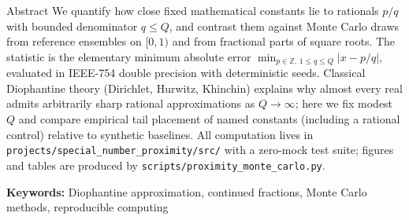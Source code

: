 \documentclass[
  ignorenonframetext,
]{beamer}
\author{\texorpdfstring{}{}}
\date{}
\begin{document}
\begin{frame}[fragile]{Abstract}
\protect{}\label{abstract}
We quantify how close fixed mathematical constants lie to rationals
\(p/q\) with bounded denominator \(q \leq Q\), and contrast them against
Monte Carlo draws from reference ensembles on \([0,1)\) and from
fractional parts of square roots. The statistic is the elementary
minimum absolute error
\(\min_{p \in \mathbb{Z},\,1 \leq q \leq Q} |x - p/q|\), evaluated in
IEEE-754 double precision with deterministic seeds. Classical
Diophantine theory (Dirichlet, Hurwitz, Khinchin) explains why almost
every real admits arbitrarily sharp rational approximations as
\(Q \to \infty\); here we fix modest \(Q\) and compare empirical tail
placement of named constants (including a rational control) relative to
synthetic baselines. All computation lives in
\texttt{projects/special\_number\_proximity/src/} with a zero-mock test
suite; figures and tables are produced by
\texttt{scripts/proximity\_monte\_carlo.py}.

\textbf{Keywords:} Diophantine approximation, continued fractions, Monte
Carlo methods, reproducible computing
\end{frame}
\end{document}

